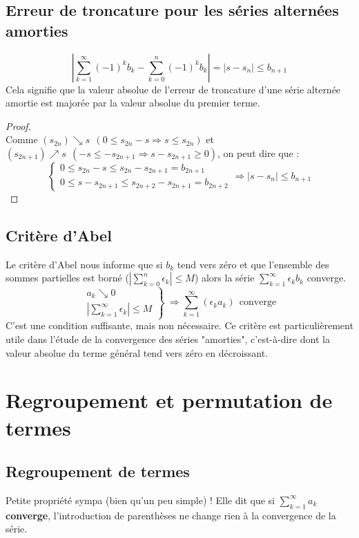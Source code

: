 \documentclass[11pt, a4paper, openany]{book}
\newcommand{\serie}{\sum_{k=1}^\infty}
\begin{document}
\subsection{Erreur de troncature pour les séries alternées amorties}
\begin{equation}
	\left| \serie (-1)^kb_k - \sum_{k=0}^n (-1)^kb_k \right| = |s - s_n| \leq b_{n+1}
\end{equation}
Cela signifie que la valeur absolue de l'erreur de troncature d'une série alternée amortie est majorée par la valeur absolue du premier terme.
\begin{proof}\ \\
	Comme $(s_{2n})\searrow s\ \ (0\leq s_{2n}-s\Rightarrow s\leq s_{2n})$ et $(s_{2n+1})\nearrow s\ \ (-s\leq -s_{2n+1}\Rightarrow s-s_{2n+1}\geq0)$, on peut dire que :$$\left\{\begin{array}{l}
	0\leq s_{2n}-s\leq s_{2n}-s_{2n+1}=b_{2n+1} \\
	0\leq s-s_{2n+1}\leq s_{2n+2}-s_{2n+1} = b_{2n+2}
	\end{array}\right.\Rightarrow |s-s_n|\leq b_{n+1}$$
\end{proof}
\setcounter{subsection}{5}
\subsection{Critère d'Abel}
Le critère d'Abel nous informe que si $b_k$ tend vers zéro et que l'ensemble des sommes partielles est borné ($|\sum_{k=0}^n \epsilon_k | \leq M$) alors la série $\serie \epsilon_kb_k$ converge.
\begin{equation}
	\left.\begin{array}{l}
	a_k \searrow0\\
	|\serie \epsilon_k| \leq M
	\end{array}\right\}\ \Rightarrow \serie (\epsilon_k a_k)\ \ \text{converge}
\end{equation}
C'est une condition suffisante, mais non nécessaire. Ce critère est particulièrement utile dans l'étude de la convergence des séries "amorties", c'est-à-dire dont la valeur absolue du terme général tend vers zéro en décroissant.
					
\section{Regroupement et permutation de termes}
\subsection{Regroupement de termes}
Petite propriété sympa (bien qu'un peu simple) ! Elle dit que si $\serie a_k$ \textbf{converge}, l'introduction de parenthèses ne change rien à la convergence de la série.
					
\end{document}
